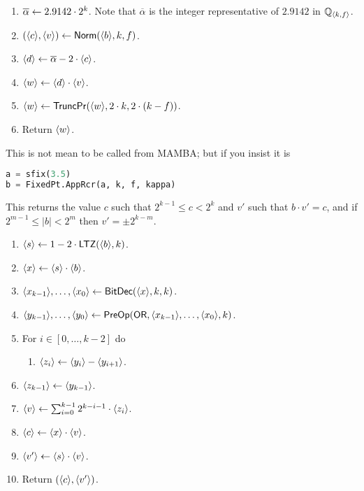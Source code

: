 \begin{enumerate}
\item $\overline{\alpha} \leftarrow 2.9142 \cdot 2^k$.
	Note that $\overline{\alpha}$ is the integer representative of $2.9142$ in ${\mathbb{Q}}_{\langle k, f \rangle}$.
\item $(\langle c \rangle,\langle v \rangle) \leftarrow \mathsf{Norm}(\langle b \rangle,k,f)$.
\item $\langle d \rangle \leftarrow \overline{\alpha} - 2 \cdot \langle c \rangle$.
\item $\langle w \rangle \leftarrow \langle d \rangle \cdot \langle v \rangle$.
\item $\langle w \rangle \leftarrow \mathsf{TruncPr}(\langle w \rangle,2 \cdot k,2 \cdot (k-f))$.
\item Return $\langle w \rangle$.
\end{enumerate}
This is not mean to be called from MAMBA; but
if you insist it is 
\begin{lstlisting}[language={python}]
a = sfix(3.5)
b = FixedPt.AppRcr(a, k, f, kappa)
\end{lstlisting}

This returns the value $c$ such that $2^{k-1} \le c <2^k$
and $v'$ such that $b \cdot v' = c$,
and if $2^{m-1} \le |b| <2^m$ then $v'= \pm 2^{k-m}$.
\begin{enumerate}
\item $\langle s \rangle \leftarrow 1-2 \cdot \mathsf{LTZ}(\langle b \rangle,k)$.
\item $\langle x \rangle \leftarrow \langle s \rangle \cdot \langle b \rangle$.
\item $\langle x_{k-1} \rangle,\ldots,\langle x_0 \rangle \leftarrow \mathsf{BitDec}(\langle x \rangle,k,k)$.
\item $\langle y_{k-1} \rangle,\ldots,\langle y_0 \rangle \leftarrow \mathsf{PreOp}(\mathsf{OR},\langle x_{k-1} \rangle,\ldots,\langle x_0 \rangle,k)$.
\item For $i \in [0,\ldots,k-2]$ do 
\begin{enumerate}
  \item $\langle z_i \rangle \leftarrow \langle y_i \rangle-\langle y_{i+1} \rangle$.
\end{enumerate}
\item $\langle z_{k-1} \rangle \leftarrow \langle y_{k-1} \rangle$.
\item $\langle v \rangle \leftarrow \sum_{i=0}^{k-1} 2^{k-i-1} \cdot \langle z_i \rangle$.
\item $\langle c \rangle \leftarrow \langle x \rangle \cdot \langle v \rangle$.
\item $\langle v' \rangle \leftarrow \langle s \rangle \cdot \langle v \rangle$.
\item Return $(\langle c \rangle, \langle v' \rangle)$.
\end{enumerate}
